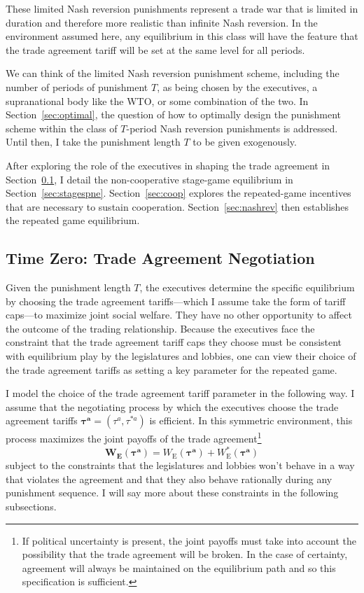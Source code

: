 \documentclass[authoryear, review]{elsarticle}
\newcommand{\bta}{\bm{\tau^a}}
\begin{document}
These limited Nash reversion punishments represent a trade war that is limited in duration and therefore more realistic than infinite Nash reversion. In the environment assumed here, any equilibrium in this class will have the feature that the trade agreement tariff will be set at the same level for all periods.

We can think of the limited Nash reversion punishment scheme, including the number of periods of punishment $T$, as being chosen by the executives, a supranational body like the WTO, or some combination of the two. In Section~\ref{sec:optimal}, the question of how to optimally design the punishment scheme within the class of $T$-period Nash reversion punishments is addressed. Until then, I take the punishment length $T$ to be given exogenously.

After exploring the role of the executives in shaping the trade agreement in Section~\ref{sec:zero}, I detail the non-cooperative stage-game equilibrium in Section~\ref{sec:stagespne}. Section~\ref{sec:coop} explores the repeated-game incentives that are necessary to sustain cooperation. Section~\ref{sec:nashrev} then establishes the repeated game equilibrium.

\subsection{Time Zero: Trade Agreement Negotiation}
\label{sec:zero}
Given the punishment length $T$, the executives determine the specific equilibrium by choosing the trade agreement tariffs---which I assume take the form of tariff caps---to maximize joint social welfare. They have no other opportunity to affect the outcome of the trading relationship.  Because the executives face the constraint that the trade agreement tariff caps they choose must be consistent with equilibrium play by the legislatures and lobbies, one can view their choice of the trade agreement tariffs as setting a key parameter for the repeated game.

I model the choice of the trade agreement tariff parameter in the following way. I assume that the negotiating process by which the executives choose the trade agreement tariffs $\bta=\left(\tau^a,\tau^{*a} \right)$ is efficient. In this symmetric environment, this process maximizes the joint payoffs of the trade agreement\footnote{If political uncertainty is present, the joint payoffs must take into account the possibility that the trade agreement will be broken. In the case of certainty, agreement will always be maintained on the equilibrium path and so this specification is sufficient.}
\begin{equation}
  \bm{W_\text{E}}(\bta) = W_\text{E}(\bta) + W_\text{E}^*(\bta)
  \label{eq:jv3}
\end{equation}
subject to the constraints that the legislatures and lobbies won't behave in a way that violates the agreement and that they also behave rationally during any punishment sequence. I will say more about these constraints in the following subsections.
\end{document}
